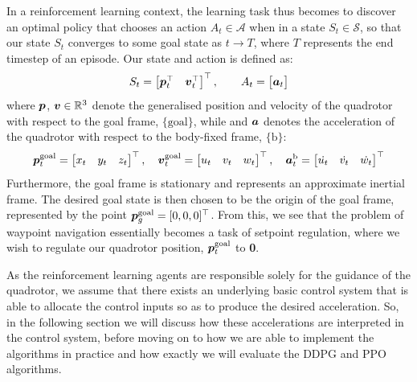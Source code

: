 In a reinforcement learning context, the learning task thus becomes to discover an optimal policy that chooses an  action $A_t \in \mathcal{A}$ when in a state $S_t \in \mathcal{S}$, so that our state $S_t$ converges to some goal state as $t \rightarrow T$, where $T$ represents the end timestep of an episode. Our state and action is defined as:
\begin{equation}
    S_t = 
    \begin{bmatrix}
    \p_t^\top & \v_t^\top%
    \end{bmatrix} ^ \top, \qquad
    A_t = 
    \begin{bmatrix}
    \a_t
    \end{bmatrix}
    \label{4_1_stateActionsSpace}
\end{equation}
where ${\boldsymbol{p}}$, ${\boldsymbol{v}} \in \mathbb{R}^3$ denote the generalised position and velocity of the quadrotor with respect to the goal frame, $\{\text{goal}\}$, while and ${\boldsymbol{a}}$ denotes the acceleration of the quadrotor with respect to the body-fixed frame, $\{\text{b}\}$:
\begin{equation}
    {\boldsymbol{p}}_t^\text{goal} = \begin{bmatrix}
    x_t & y_t & z_t
    \end{bmatrix}^\top, \quad
    {\boldsymbol{v}}_t^\text{goal} = \begin{bmatrix}
    u_t & v_t & w_t
    \end{bmatrix}^\top, \quad
    {\boldsymbol{a}}_t^\text{b} = \begin{bmatrix}
    \Dot{u_t} & \Dot{v_t} & \Dot{w_t}
    \end{bmatrix}^\top
\end{equation}
Furthermore, the goal frame is stationary and represents an approximate inertial frame. The desired goal state is then chosen to be the origin of the goal frame, represented by the point ${\boldsymbol{p}}^\text{goal}_g = [0,0,0]^\top$.
From this, we see that the problem of waypoint navigation essentially becomes a task of setpoint regulation, where we wish to regulate our quadrotor position, ${\boldsymbol{p}}_t^\text{goal}$ to \textbf{0}.

As the reinforcement learning agents are responsible solely for the guidance of the quadrotor, we assume that there exists an underlying basic control system that is able to allocate the control inputs so as to produce the desired acceleration.
So, in the following section we will discuss how these accelerations are interpreted in the control system, before moving on to how we are able to implement the algorithms in practice and how exactly we will evaluate the DDPG and PPO algorithms.


